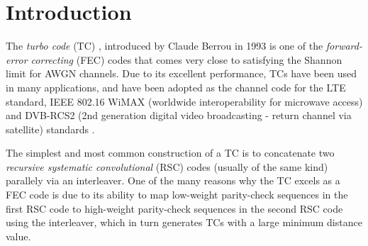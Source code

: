 \section{Introduction}

The {\it turbo code} (TC) \cite{ref1}, introduced by Claude Berrou in 1993 is one of the \textit{forward-error correcting} (FEC) codes that comes very close to satisfying the Shannon limit for AWGN channels.  Due to its excellent performance, TCs have been used in many applications,  and  have been adopted as the channel code for the LTE standard, IEEE 802.16 WiMAX (worldwide interoperability for microwave access) and DVB-RCS2 (2nd generation digital video broadcasting - return channel via satellite) standards \cite{ref7}.

 The simplest and most common construction of a TC is  to concatenate  two {\it recursive systematic convolutional} (RSC) codes (usually of the same kind) parallely  via an interleaver. One of the many reasons why the TC excels as a FEC code is due to its ability to map low-weight parity-check sequences in the first RSC code to high-weight parity-check sequences in the second RSC code using the interleaver, which in turn generates TCs with a large minimum distance value.


